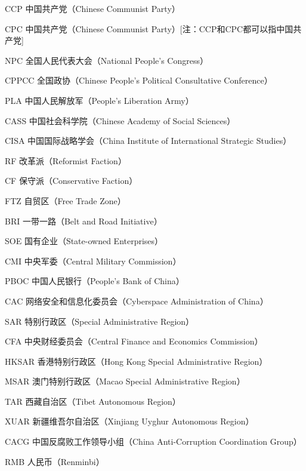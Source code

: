 
\begin{denotation}[3cm]
  \item[CCP] 中国共产党（Chinese Communist Party）
  \item[CPC] 中国共产党（Chinese Communist Party）[注：CCP和CPC都可以指中国共产党]
  \item[NPC] 全国人民代表大会（National People's Congress）
  \item[CPPCC] 全国政协（Chinese People's Political Consultative Conference）
  \item[PLA] 中国人民解放军（People's Liberation Army）
  \item[CASS] 中国社会科学院（Chinese Academy of Social Sciences）
  \item[CISA] 中国国际战略学会（China Institute of International Strategic Studies）
  \item[RF] 改革派（Reformist Faction）
  \item[CF] 保守派（Conservative Faction）
  \item[FTZ] 自贸区（Free Trade Zone）
  \item[BRI] 一带一路（Belt and Road Initiative）
  \item[SOE] 国有企业（State-owned Enterprises）
  \item[CMI] 中央军委（Central Military Commission）
  \item[PBOC] 中国人民银行（People's Bank of China）
  \item[CAC] 网络安全和信息化委员会（Cyberspace Administration of China）
  \item[SAR] 特别行政区（Special Administrative Region）
  \item[CFA] 中央财经委员会（Central Finance and Economics Commission）
  \item[HKSAR] 香港特别行政区（Hong Kong Special Administrative Region）
  \item[MSAR] 澳门特别行政区（Macao Special Administrative Region）
  \item[TAR] 西藏自治区（Tibet Autonomous Region）
  \item[XUAR] 新疆维吾尔自治区（Xinjiang Uyghur Autonomous Region）
  \item[CACG] 中国反腐败工作领导小组（China Anti-Corruption Coordination Group）
  \item[RMB] 人民币（Renminbi）
\end{denotation}





